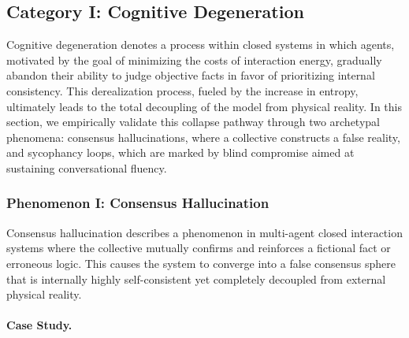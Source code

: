 \documentclass{article}
\theoremstyle{definition}
\theoremstyle{plain}
\begin{document}
\subsection{Category I: Cognitive Degeneration}


Cognitive degeneration denotes a process within closed systems in which agents, motivated by the goal of minimizing the costs of interaction energy, gradually abandon their ability to judge objective facts in favor of prioritizing internal consistency. 
This derealization process, fueled by the increase in entropy, ultimately leads to the total decoupling of the model from physical reality. 
In this section, we empirically validate this collapse pathway through two archetypal phenomena: consensus hallucinations, where a collective constructs a false reality, and sycophancy loops, which are marked by blind compromise aimed at sustaining conversational fluency.

\subsubsection{Phenomenon I: Consensus Hallucination}

Consensus hallucination describes a phenomenon in multi-agent closed interaction systems where the collective mutually confirms and reinforces a fictional fact or erroneous logic. 
This causes the system to converge into a false consensus sphere that is internally highly self-consistent yet completely decoupled from external physical reality.

\paragraph{Case Study.}
\end{document}
